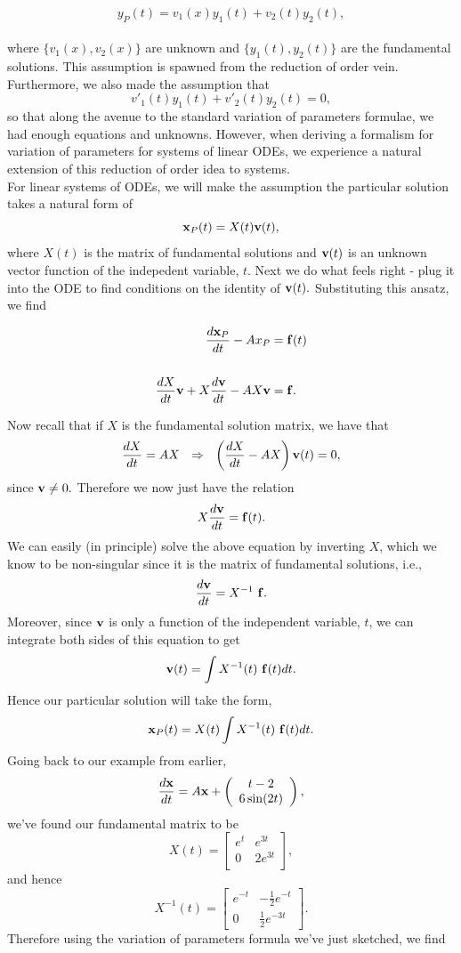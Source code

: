 \begin{itemize}
$$y_P(t) = v_1(x) y_1(t) + v_2(t) y_2(t),$$\\
%
where $\{v_1(x), v_2(x)\}$ are unknown and $\{ y_1(t), y_2(t) \}$ are the fundamental solutions. This assumption is spawned from the reduction of order vein. Furthermore, we also made the assumption that $$v'_1(t) y_1(t) + v'_2(t) y_2(t) = 0,$$
%
so that along the avenue to the standard variation of parameters formulae, we had enough equations and unknowns. However, when deriving a formalism for variation of parameters for systems of linear ODEs, we experience a natural extension of this reduction of order idea to systems. \\

For linear systems of ODEs, we will make the assumption the particular solution takes a natural form of $${\bf{x}}_P(t) = X(t) {\bf{v}}(t),$$
%
where $X(t)$ is the matrix of fundamental solutions and ${\bf{v}}(t)$ is an unknown vector function of the indepedent variable, $t$. Next we do what feels right - plug it into the ODE to find conditions on the identity of ${\bf{v}}(t).$ Substituting this ansatz, we find

\begin{align*}
\frac{d{\bf{x}}_P}{dt} - Ax_P &= {\bf{f}}(t) \\ \\
\frac{dX}{dt} {\bf{v}} + X \frac{d{\bf{v}}}{dt} - AX{\bf{v}} &= {\bf{f}}. \\
\end{align*}

Now recall that if $X$ is the fundamental solution matrix, we have that $$\frac{dX}{dt} = AX \ \ \Rightarrow \ \  \left( \frac{dX}{dt} - AX \right) {\bf{v}}(t) = 0,$$ 
%
since ${\bf{v}} \neq 0.$ Therefore we now just have the relation 
$$X \frac{d{\bf{v}}}{dt} = {\bf{f}}(t).$$
%
We can easily (in principle) solve the above equation by inverting $X$, which we know to be non-singular since it is the matrix of fundamental solutions, i.e., 
$$\frac{d{\bf{v}}}{dt} = X^{-1}\  {\bf{f}}.$$
% 
Moreover, since ${\bf{v}}$ is only a function of the independent variable, $t$, we can integrate both sides of this equation to get
$${\bf{v}}(t) = \int X^{-1}(t)\ {\bf{f}}(t) dt.$$
%
Hence our particular solution will take the form, 
$${\bf{x}}_P(t) = X(t) \int X^{-1}(t)\ {\bf{f}}(t) dt.$$
%
Going back to our example from earlier, 
$$\frac{d{\bf{x}}}{dt} = A{\bf{x}} + \left(\begin{array}{c} t-2 \\ 6\sin(2t)  \end{array}\right),$$
%
we've found our fundamental matrix to be 
$$X(t) = \left[  \begin{array}{cc} e^{t} & e^{3t} \\ 0 & 2e^{3t} \\  \end{array}\right],$$
%
and hence 
$$X^{-1}(t) = \left[ \begin{array}{cc} e^{-t} & -\frac{1}{2}e^{-t} \\ 0 & \frac{1}{2} e^{-3t}  \end{array}\right].$$
%
Therefore using the variation of parameters formula we've just sketched, we find


\end{itemize}
